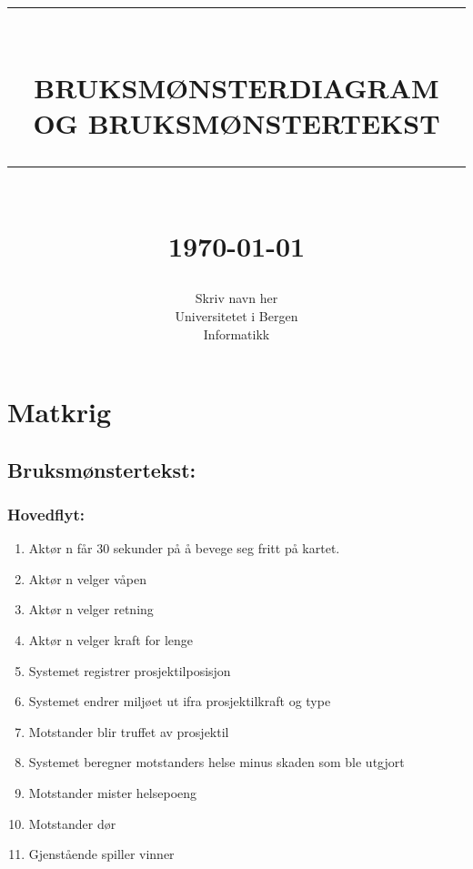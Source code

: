 \documentclass[12pt]{report}
\newcommand{\HRule}[1]{\rule{\linewidth}{#1}}
\begin{document}
\title{ \normalsize \textsc{}
		\\ [2.0cm]
		\HRule{0.5pt} \\
		\LARGE \textbf{\uppercase{Bruksm{\O}nsterdiagram og bruksm{\O}nstertekst}}
		\HRule{2pt} \\ [0.5cm]
		\normalsize \today \vspace*{5\baselineskip}}

\date{}

\author{
		Skriv navn her  \\  %
		Universitetet i Bergen \\
		Informatikk }

\maketitle
\tableofcontents
\newpage

\sectionfont{\scshape}


\section*{Matkrig}

\subsection*{Bruksm{\o}nstertekst:}

\subsubsection*{Hovedflyt:}
\begin{enumerate}
\item Akt{\o}r n f{\aa}r 30 sekunder p{\aa} {\aa} bevege seg fritt p{\aa} kartet. 
\item Akt{\o}r n velger v{\aa}pen 
\item Akt{\o}r n velger retning 
\item Akt{\o}r n velger kraft for lenge
\item Systemet registrer prosjektilposisjon 
\item Systemet endrer milj{\o}et ut ifra prosjektilkraft og type 
\item Motstander blir truffet av prosjektil 
\item Systemet beregner motstanders helse minus skaden som ble utgjort
\item Motstander mister helsepoeng 
\item Motstander d{\o}r
\item Gjenst{\aa}ende spiller vinner
\end{enumerate}
\end{document}
